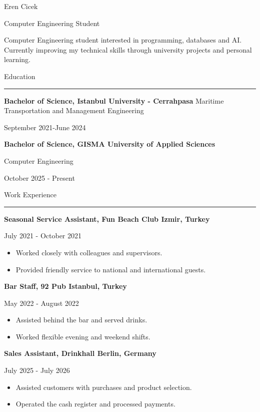 \documentclass{letter}
\begin{document}
\begin{minipage}[t]{0.60\textwidth}
\setlength{\baselineskip}{1.5\baselineskip}
\vspace{0.8cm}
{\huge Eren Cicek}

{\large Computer Engineering Student}

\vspace{0.5cm}
 
Computer Engineering student interested in programming, databases and AI. Currently improving my technical skills through university projects and personal learning.

\vspace{0.5cm}

{\large Education}
\rule{\linewidth}{0.4pt}

{\large \textbf{Bachelor of Science, Istanbul University - Cerrahpasa}}
{\small Maritime Transportation and Management Engineering}

{\small September 2021-June 2024}

{\large \textbf{Bachelor of Science, GISMA University of Applied Sciences}}

{\small Computer Engineering}

{\small October 2025 - Present}

\vspace{0.5cm}


{\large Work Experience}
\rule{\linewidth}{0.4pt}

{\large \textbf{Seasonal Service Assistant, Fun Beach Club  \small Izmir, Turkey}}

{\small July 2021 - October 2021}

\begin{itemize}
    \item Worked closely with colleagues and supervisors.
    \item Provided friendly service to national and international guests.
\end{itemize}

{\large \textbf{Bar Staff, 92 Pub 
\small Istanbul, Turkey}}

{\small May 2022 - August 2022}

\begin{itemize}
    \item Assisted behind the bar and served drinks.
    \item Worked flexible evening and weekend shifts.
\end{itemize}


{\large \textbf{Sales Assistant, Drinkhall \small Berlin, Germany}}

{\small July 2025 - July 2026}

\begin{itemize}
    \item Assisted customers with purchases and product selection.
    \item Operated the cash register and processed payments.
\end{itemize}




\end{minipage}
\end{document}

